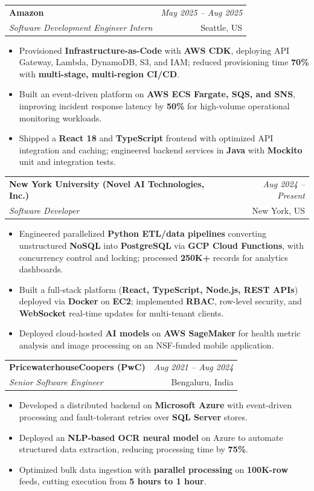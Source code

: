 \documentclass[a4paper,10pt]{article}
\makeatletter
\newcommand{\resumeSubheading}[4]{
\vspace{0.3mm}\item
    \begin{tabular*}{0.98\textwidth}[t]{l@{\extracolsep{\fill}}r}
        \textbf{#1} & \textit{\footnotesize{#4}} \\
        \textit{\footnotesize{#3}} & \footnotesize{#2}\\
    \end{tabular*}\vspace{-2mm}
}
\newcommand{\resumeItemListStart}{\begin{itemize}[leftmargin=*, labelsep=1mm, itemsep=0pt]}
\newcommand{\resumeItemListEnd}{\end{itemize}\vspace{-2mm}}
\makeatother
\begin{document}
\resumeSubheading
{Amazon}{Seattle, US}
{Software Development Engineer Intern}{May 2025 -- Aug 2025}
\resumeItemListStart
\item \footnotesize{Provisioned \textbf{Infrastructure-as-Code} with \textbf{AWS CDK}, deploying API Gateway, Lambda, DynamoDB, S3, and IAM; reduced provisioning time \textbf{70\%} with \textbf{multi-stage, multi-region CI/CD}.}
\item \footnotesize{Built an event-driven platform on \textbf{AWS ECS Fargate, SQS, and SNS}, improving incident response latency by \textbf{50\%} for high-volume operational monitoring workloads.}
\item \footnotesize{Shipped a \textbf{React 18} and \textbf{TypeScript} frontend with optimized API integration and caching; engineered backend services in \textbf{Java} with \textbf{Mockito} unit and integration tests.}
\resumeItemListEnd

\resumeSubheading
{New York University (Novel AI Technologies, Inc.)}{New York, US}
{Software Developer}{Aug 2024 -- Present}
\resumeItemListStart
\item \footnotesize{Engineered parallelized \textbf{Python ETL/data pipelines} converting unstructured \textbf{NoSQL} into \textbf{PostgreSQL} via \textbf{GCP Cloud Functions}, with concurrency control and locking; processed \textbf{250K+} records for analytics dashboards.}
\item \footnotesize{Built a full-stack platform (\textbf{React, TypeScript, Node.js, REST APIs}) deployed via \textbf{Docker} on \textbf{EC2}; implemented \textbf{RBAC}, row-level security, and \textbf{WebSocket} real-time updates for multi-tenant clients.}
\item \footnotesize{Deployed cloud-hosted \textbf{AI models} on \textbf{AWS SageMaker} for health metric analysis and image processing on an NSF-funded mobile application.}
\resumeItemListEnd

\resumeSubheading
{PricewaterhouseCoopers (PwC)}{Bengaluru, India}
{Senior Software Engineer}{Aug 2021 -- Aug 2024}
\resumeItemListStart
\item \footnotesize{Developed a distributed backend on \textbf{Microsoft Azure} with event-driven processing and fault-tolerant retries over \textbf{SQL Server} stores.}
\item \footnotesize{Deployed an \textbf{NLP-based OCR neural model} on Azure to automate structured data extraction, reducing processing time by \textbf{75\%}.}
\item \footnotesize{Optimized bulk data ingestion with \textbf{parallel processing} on \textbf{100K-row} feeds, cutting execution from \textbf{5 hours to 1 hour}.}
\resumeItemListEnd
\end{document}
